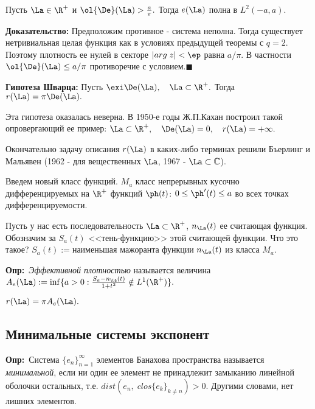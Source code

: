 \documentclass[a4paper]{article}
\def\defin{\noindent\textbf{Опр:}\ }
\begin{document}
\begin{theorems}
Пусть $\La\in \R ^{+}$ и
$\ol{\De}(\La)>\frac a{\pi}.$ Тогда $e(\La)$
полна в $L^2(-a,a).$
\end{theorems}
\textbf{Доказательство:} Предположим противное - система неполна.
Тогда существует нетривиальная целая функция как в условиях
предыдущей теоремы с $q=2.$ Поэтому плотность ее нулей в секторе
$|arg\;z|<\ep$ равна $a/\pi$. В частности
$\ol{\De}(\La)\le a/\pi$ противоречие с
условием.$\blacksquare$

\medskip\noindent \textbf{Гипотеза Шварца:} Пусть
$\exi\De(\La),\quad\La\subset\R ^{+}.$ Тогда
$r(\La)=\pi\De(\La).$

Эта гипотеза оказалась неверна. В 1950-е годы Ж.П.Кахан построил
такой опровергающий ее пример:
$\La\subset\R ^{+},\quad\De(\La)=0,\quad
r(\La)=+\infty.$

Окончательно задачу описания $r(\La)$ в каких-либо терминах
решили Бъерлинг и Мальявен (1962 - для вещественных $\La$,
1967 - $\La\subset\mathbb{C}$).

Введем новый класс функций. $M_a$ класс непрерывных кусочно
дифференцируемых на $\R ^{+}$ функций $\ph(t)$:
$0\le\ph'(t)\le a$ во всех точках дифференцируемости.

\begin{wrapfigure}[7]{l}{5.4cm}
\end{wrapfigure}

Пусть у нас есть последовательность
$\La\subset\R ^{+}$, $n_{\La}(t)$ ее считающая
функция. Обозначим за $S_a(t)$ <<тень-функцию>> этой считающей
функции. Что это такое? $S_a(t):=$наименьшая мажоранта функции
$n_{\La}(t)$ из класса $M_a$.

\defin \emph{Эффективной плотностью} называется
величина
$A_e(\La):=\inf\{a>0:\frac{S_a-n_{\La}(t)}{1+t^2}\notin
L^1(\R ^{+})\}.$

\begin{theorems}
$r(\La)=\pi A_e(\La).$
\end{theorems}

\subsection{Минимальные системы экспонент}

\defin Система $\{e_n\}_{n=1}^{\infty}$ элементов Банахова
пространства называется \emph{минимальной}, если ни один ее
элемент не принадлежит замыканию линейной оболочки остальных, т.е.
$dist(e_n,\;clos \{e_k\}_{k\neq n})>0$. Другими словами, нет
лишних элементов.
\end{document}
